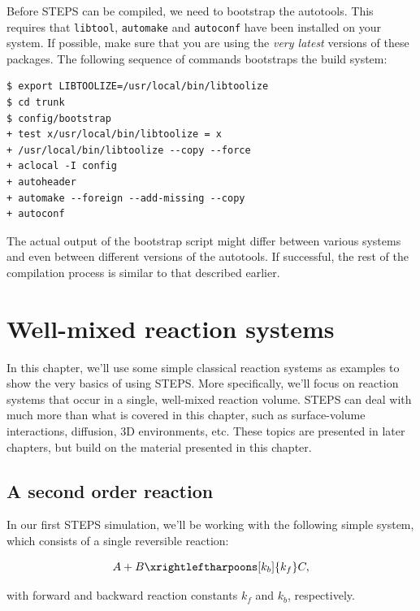 \documentclass[a4paper,12pt]{book}
\begin{document}
Before STEPS can be compiled, we need to bootstrap the autotools. This requires that \texttt{libtool}, \texttt{automake} and \texttt{autoconf} have been installed on your system. If possible, make sure that you are using the \emph{very latest} versions of these packages. The following sequence of commands bootstraps the build system:

\begin{verbatim}
$ export LIBTOOLIZE=/usr/local/bin/libtoolize
$ cd trunk
$ config/bootstrap
+ test x/usr/local/bin/libtoolize = x
+ /usr/local/bin/libtoolize --copy --force
+ aclocal -I config
+ autoheader
+ automake --foreign --add-missing --copy
+ autoconf
\end{verbatim}

The actual output of the bootstrap script might differ between various systems and even between different versions of the autotools. If successful, the rest of the compilation process is similar to that described earlier.

\chapter{Well-mixed reaction systems}

In this chapter, we'll use some simple classical reaction systems as examples to show the very basics of using STEPS. More specifically, we'll focus on reaction systems that occur in a single, well-mixed reaction volume. STEPS can deal with much more than what is covered in this chapter, such as surface-volume interactions, diffusion, 3D environments, etc. These topics are presented in later chapters, but build on the material presented in this chapter.

\section{A second order reaction}

In our first STEPS simulation, we'll be working with the following simple system, which consists of a single reversible reaction:

\begin{equation}
\label{eqn:secondorderreaction}
A + B \xrightleftharpoons[k_b]{k_f} C,
\end{equation}

with forward and backward reaction constants $k_f$ and $k_b$, respectively.
\end{document}
